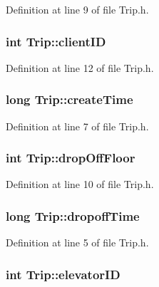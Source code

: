 Definition at line 9 of file Trip.\+h.

\subsubsection[{client\+I\+D}]{\setlength{\rightskip}{0pt plus 5cm}int Trip\+::client\+I\+D}\label{struct_trip_a439a16d8f60a6f0082fe013471e95f8e}


Definition at line 12 of file Trip.\+h.

\subsubsection[{create\+Time}]{\setlength{\rightskip}{0pt plus 5cm}long Trip\+::create\+Time}\label{struct_trip_ab24fb09ff870245973d166fb41130342}


Definition at line 7 of file Trip.\+h.

\subsubsection[{drop\+Off\+Floor}]{\setlength{\rightskip}{0pt plus 5cm}int Trip\+::drop\+Off\+Floor}\label{struct_trip_aa698c9522767f86364bffda768c48b7e}


Definition at line 10 of file Trip.\+h.

\subsubsection[{dropoff\+Time}]{\setlength{\rightskip}{0pt plus 5cm}long Trip\+::dropoff\+Time}\label{struct_trip_a32dff92efdcabc7294328d8e23b238af}


Definition at line 5 of file Trip.\+h.

\subsubsection[{elevator\+I\+D}]{\setlength{\rightskip}{0pt plus 5cm}int Trip\+::elevator\+I\+D}\label{struct_trip_a734134f36b0e7d28e79ed51209033505}


